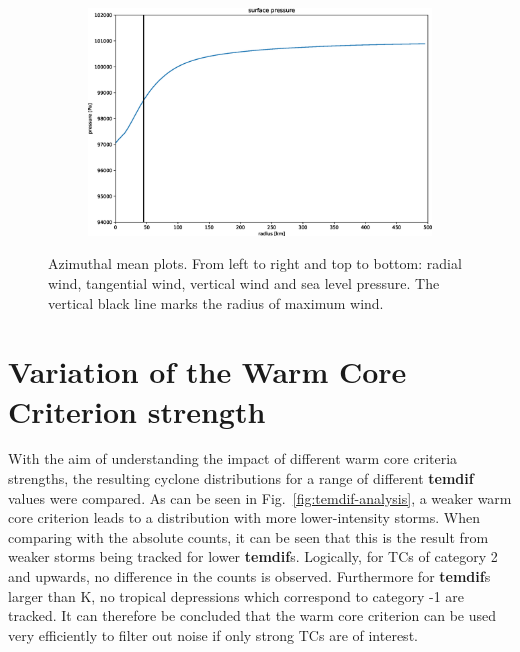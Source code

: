 \begin{figure}[ht]
\begin{subfigure}{.5\linewidth}
\end{subfigure}%
\begin{subfigure}{.5\linewidth}
    \centering
    \includegraphics[width=0.75\linewidth]{img/tight09279566pres_msl20130706T120000Z.eps}
\end{subfigure}
\caption[short]{Azimuthal mean plots. From left to right and top to bottom: radial wind, tangential wind, vertical wind and sea level pressure. The vertical black line marks the radius of maximum wind.}
\label{fig:azimean}
\end{figure}


\section{Variation of the Warm Core Criterion strength}
With the aim of understanding the impact of different warm core criteria strengths, the resulting cyclone distributions for a range of different \textbf{temdif} values were compared. As can be seen in Fig.~\ref{fig:temdif-analysis}, a weaker warm core criterion leads to a distribution with more lower-intensity storms. When comparing with the absolute counts, it can be seen that this is the result from weaker storms being tracked for lower \textbf{temdif}s. Logically, for TCs of category 2 and upwards, no difference in the counts is observed. Furthermore for \textbf{temdif}s larger than \unit[1]{K}, no tropical depressions which correspond to category -1 are tracked. It can therefore be concluded that the warm core criterion can be used very efficiently to filter out noise if only strong TCs are of interest.

